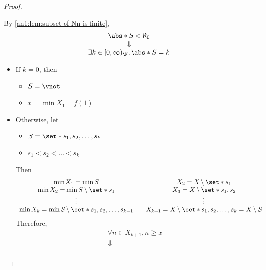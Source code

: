 \begin{proof}
\begin{itemize}
\[          \]
          By \cref{an1:lem:subset-of-Nn-is-finite},
          \[
            \begin{array}{c}
              \abs*{S} < \aleph_{0} \\
              \Downarrow            \\
              \exists k \in [0, \infty)_{\N}, \abs*{S} = k
            \end{array}
          \]
          \begin{itemize}
            \item If $k = 0$, then
                  \begin{itemize}
                    \item $S = \vnot$
                    \item $x = \min X_{1} = f(1)$
                  \end{itemize}
            \item Otherwise, let
                  \begin{itemize}
                    \item $S = \set*{s_{1}, s_{2}, \dots, s_{k}}$
                    \item $s_{1} < s_{2} < \dots < s_{k}$
                  \end{itemize}
                  Then
                  \[
                    \begin{array}{c@{\quad\quad}c}
                      \min X_{1} = \min S
                       & X_{2} = X \setminus \set*{s_{1}}                                          \\
                      \min X_{2} = \min S \setminus \set*{s_{1}}
                       & X_{3} = X \setminus \set*{s_{1}, s_{2}}                                   \\
                      \vdots
                       & \vdots                                                                    \\
                      \min X_{k} = \min S \setminus \set*{s_{1}, s_{2}, \dots, s_{k - 1}}
                       & X_{k + 1} = X \setminus \set*{s_{1}, s_{2}, \dots, s_{k}} = X \setminus S
                    \end{array}
                  \]
                  Therefore,
                  \[
                    \begin{array}{c}
                      \forall n \in X_{k + 1}, n \geq x \\
                      \Downarrow                        \\

\end{array}\]
\end{itemize}
\end{itemize}
\end{proof}
